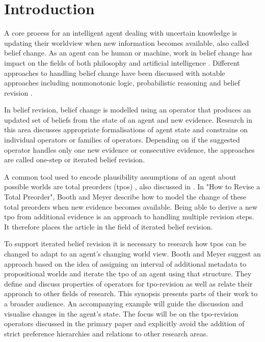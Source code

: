 \documentclass[english, 12pt]{scrartcl}
\theoremstyle{definition}
\theoremstyle{definition}
\theoremstyle{definition}
\begin{document}
\newpage

\tableofcontents

\newpage

\section{Introduction}
A core process for an intelligent agent dealing with uncertain knowledge is updating their worldview when new information becomes available, also called belief change. As an agent can be human or machine, work in belief change has impact on the fields of both philosophy and artificial intelligence \cite{Ferme2011}. Different approaches to handling belief change have been discussed with notable approaches including nonmonotonic logic, probabilistic reasoning and belief revision \cite{Darwiche1997}.

In belief revision, belief change is modelled using an operator that produces an updated set of beliefs from the state of an agent and new evidence. Research in this area discusses appropriate formalisations of agent state and constrains on individual operators or families of operators. Depending on if the suggested operator handles only one new evidence or consecutive evidence, the approaches are called one-step or iterated belief revision.

A common tool used to encode plausibility assumptions of an agent about possible worlds are total preorders (tpos) \cite{Booth2011}, also discussed in \cite{Katsuno1991}. In "How to Revise a Total Preorder", Booth and Meyer describe how to model the change of these total preorders when new evidence becomes available. Being able to derive a new tpo from additional evidence is an approach to handling multiple revision steps. It therefore places the article in the field of iterated belief revision.

To support iterated belief revision it is necessary to research how tpos can be changed to adapt to an agent's changing world view.
Booth and Meyer suggest an approach based on the idea of assigning an interval of additional metadata to propositional worlds and iterate the tpo of an agent using that structure. They define and discuss properties of operators for tpo-revision as well as relate their approach to other fields of research.
This synopsis presents parts of their work to a broader audience. An accompanying example will guide the discussion and visualise changes in the agent's state. The focus will be on the tpo-revision operators discussed in the primary paper and explicitly avoid the addition of strict preference hierarchies and relations to other research areas.
\end{document}
